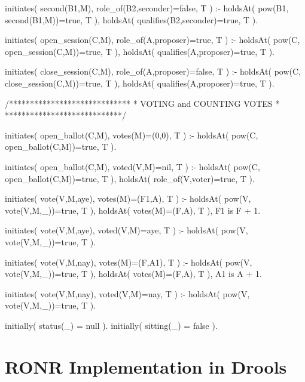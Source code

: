 \begin{prologinline}[caption=Implementation of RONR in Prolog]
initiates( second(B1,M), role_of(B2,seconder)=false, T ) :-
	holdsAt( pow(B1, second(B1,M))=true, T ),
    holdsAt( qualifies(B2,seconder)=true, T ).

initiates( open_session(C,M), role_of(A,proposer)=true, T ) :-
	holdsAt( pow(C, open_session(C,M))=true, T ),
	holdsAt( qualifies(A,proposer)=true, T ).

initiates( close_session(C,M), role_of(A,proposer)=false, T ) :-
	holdsAt( pow(C, close_session(C,M))=true, T ),
	holdsAt( qualifies(A,proposer)=true, T ).

/*****************************
 * VOTING and COUNTING VOTES *
 ****************************/


initiates( open_ballot(C,M), votes(M)=(0,0), T ) :-
	holdsAt( pow(C, open_ballot(C,M))=true, T ).

initiates( open_ballot(C,M), voted(V,M)=nil, T ) :-
    holdsAt( pow(C, open_ballot(C,M))=true, T ),
	holdsAt( role_of(V,voter)=true, T ).

initiates( vote(V,M,aye), votes(M)=(F1,A), T ) :-
	holdsAt( pow(V, vote(V,M,_))=true, T ),
	holdsAt( votes(M)=(F,A), T ),
	F1 is F + 1.

initiates( vote(V,M,aye), voted(V,M)=aye, T ) :-
	holdsAt( pow(V, vote(V,M,_))=true, T ).

initiates( vote(V,M,nay), votes(M)=(F,A1), T ) :-
	holdsAt( pow(V, vote(V,M,_))=true, T ),
	holdsAt( votes(M)=(F,A), T ),
	A1 is A + 1.

initiates( vote(V,M,nay), voted(V,M)=nay, T ) :-
	holdsAt( pow(V, vote(V,M,_))=true, T ).

initially( status(_) = null ).
initially( sitting(_) = false ).
\end{prologinline}

\section{RONR Implementation in Drools}\label{sec:ronrdrools}

